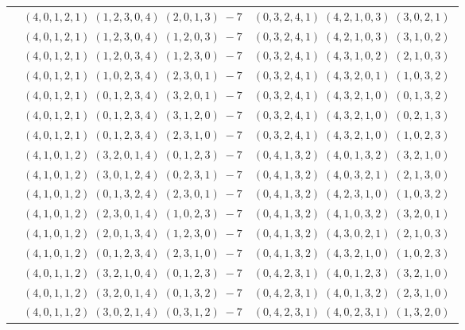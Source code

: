 \documentclass[11pt]{article}
\begin{document}
\begin{longtable}[l]{|c|c|c|}
 \cline{2-3} 
 & $(4 ,0 ,1 ,2 ,1) \;(1 ,2 ,3 ,0 ,4) \;(2 ,0 ,1 ,3) \;-7$ & $(0 ,3 ,2 ,4 ,1) \;(4 ,2 ,1 ,0 ,3) \;(3 ,0 ,2 ,1) \;$\\ 
 \cline{2-3} 
 & $(4 ,0 ,1 ,2 ,1) \;(1 ,2 ,3 ,0 ,4) \;(1 ,2 ,0 ,3) \;-7$ & $(0 ,3 ,2 ,4 ,1) \;(4 ,2 ,1 ,0 ,3) \;(3 ,1 ,0 ,2) \;$\\ 
 \cline{2-3} 
 & $(4 ,0 ,1 ,2 ,1) \;(1 ,2 ,0 ,3 ,4) \;(1 ,2 ,3 ,0) \;-7$ & $(0 ,3 ,2 ,4 ,1) \;(4 ,3 ,1 ,0 ,2) \;(2 ,1 ,0 ,3) \;$\\ 
 \cline{2-3} 
 & $(4 ,0 ,1 ,2 ,1) \;(1 ,0 ,2 ,3 ,4) \;(2 ,3 ,0 ,1) \;-7$ & $(0 ,3 ,2 ,4 ,1) \;(4 ,3 ,2 ,0 ,1) \;(1 ,0 ,3 ,2) \;$\\ 
 \cline{2-3} 
 & $(4 ,0 ,1 ,2 ,1) \;(0 ,1 ,2 ,3 ,4) \;(3 ,2 ,0 ,1) \;-7$ & $(0 ,3 ,2 ,4 ,1) \;(4 ,3 ,2 ,1 ,0) \;(0 ,1 ,3 ,2) \;$\\ 
 \cline{2-3} 
 & $(4 ,0 ,1 ,2 ,1) \;(0 ,1 ,2 ,3 ,4) \;(3 ,1 ,2 ,0) \;-7$ & $(0 ,3 ,2 ,4 ,1) \;(4 ,3 ,2 ,1 ,0) \;(0 ,2 ,1 ,3) \;$\\ 
 \cline{2-3} 
 & $(4 ,0 ,1 ,2 ,1) \;(0 ,1 ,2 ,3 ,4) \;(2 ,3 ,1 ,0) \;-7$ & $(0 ,3 ,2 ,4 ,1) \;(4 ,3 ,2 ,1 ,0) \;(1 ,0 ,2 ,3) \;$\\ 
 \cline{2-3} 
 & $(4 ,1 ,0 ,1 ,2) \;(3 ,2 ,0 ,1 ,4) \;(0 ,1 ,2 ,3) \;-7$ & $(0 ,4 ,1 ,3 ,2) \;(4 ,0 ,1 ,3 ,2) \;(3 ,2 ,1 ,0) \;$\\ 
 \cline{2-3} 
 & $(4 ,1 ,0 ,1 ,2) \;(3 ,0 ,1 ,2 ,4) \;(0 ,2 ,3 ,1) \;-7$ & $(0 ,4 ,1 ,3 ,2) \;(4 ,0 ,3 ,2 ,1) \;(2 ,1 ,3 ,0) \;$\\ 
 \cline{2-3} 
 & $(4 ,1 ,0 ,1 ,2) \;(0 ,1 ,3 ,2 ,4) \;(2 ,3 ,0 ,1) \;-7$ & $(0 ,4 ,1 ,3 ,2) \;(4 ,2 ,3 ,1 ,0) \;(1 ,0 ,3 ,2) \;$\\ 
 \cline{2-3} 
 & $(4 ,1 ,0 ,1 ,2) \;(2 ,3 ,0 ,1 ,4) \;(1 ,0 ,2 ,3) \;-7$ & $(0 ,4 ,1 ,3 ,2) \;(4 ,1 ,0 ,3 ,2) \;(3 ,2 ,0 ,1) \;$\\ 
 \cline{2-3} 
 & $(4 ,1 ,0 ,1 ,2) \;(2 ,0 ,1 ,3 ,4) \;(1 ,2 ,3 ,0) \;-7$ & $(0 ,4 ,1 ,3 ,2) \;(4 ,3 ,0 ,2 ,1) \;(2 ,1 ,0 ,3) \;$\\ 
 \cline{2-3} 
 & $(4 ,1 ,0 ,1 ,2) \;(0 ,1 ,2 ,3 ,4) \;(2 ,3 ,1 ,0) \;-7$ & $(0 ,4 ,1 ,3 ,2) \;(4 ,3 ,2 ,1 ,0) \;(1 ,0 ,2 ,3) \;$\\ 
 \cline{2-3} 
 & $(4 ,0 ,1 ,1 ,2) \;(3 ,2 ,1 ,0 ,4) \;(0 ,1 ,2 ,3) \;-7$ & $(0 ,4 ,2 ,3 ,1) \;(4 ,0 ,1 ,2 ,3) \;(3 ,2 ,1 ,0) \;$\\ 
 \cline{2-3} 
 & $(4 ,0 ,1 ,1 ,2) \;(3 ,2 ,0 ,1 ,4) \;(0 ,1 ,3 ,2) \;-7$ & $(0 ,4 ,2 ,3 ,1) \;(4 ,0 ,1 ,3 ,2) \;(2 ,3 ,1 ,0) \;$\\ 
 \cline{2-3} 
 & $(4 ,0 ,1 ,1 ,2) \;(3 ,0 ,2 ,1 ,4) \;(0 ,3 ,1 ,2) \;-7$ & $(0 ,4 ,2 ,3 ,1) \;(4 ,0 ,2 ,3 ,1) \;(1 ,3 ,2 ,0) \;$\\ 

\end{longtable}
\end{document}
